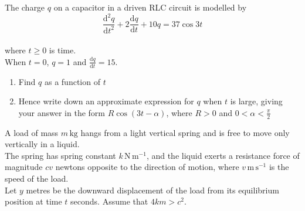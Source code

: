 \documentclass[leqno]{article}
\begin{document}
\begin{enumerate}[
  label=\textbf{\arabic*.},
  leftmargin=*,
  topsep=0pt,
  partopsep=0pt,
  parsep=0pt
]
\newpage

\questionitem

The charge $q$ on a capacitor in a driven RLC circuit is modelled by \\
\[\frac{\mathrm{d}^2 q}{\mathrm{d} t^2}+2\frac{\mathrm{d} q}{\mathrm{d} t}+10q=37\cos 3t\] \\
where $t\geq0$ is time. \\

When $t=0$, $q=1$ and $\frac{\mathrm{d} q}{\mathrm{d} t}=15$. \\

\begin{enumerate}[label=\textbf{(\alph*)}]
  \item Find $q$ as a function of $t$  \\
  \item Hence write down an approximate expression for $q$ when $t$ is large, giving your answer in the form $R\cos(3t-\alpha)$, where $R>0$ and $0<\alpha<\frac{\pi}{2}$  \\
\end{enumerate}

\newpage

\questionitem

A load of mass $m\,\mathrm{kg}$ hangs from a light vertical spring and is free to move only vertically in a liquid. \\

The spring has spring constant $k\,\mathrm{N\,m^{-1}}$, and the liquid exerts a resistance force of magnitude $c v$ newtons opposite to the direction of motion, where $v\,\mathrm{m\,s^{-1}}$ is the speed of the load. \\

Let $y$ metres be the downward displacement of the load from its equilibrium position at time $t$ seconds. Assume that $4km>c^2$. \\


\end{enumerate}
\end{document}
